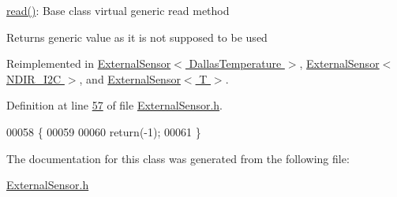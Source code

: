 \hyperlink{class_base_external_sensor_a7e0a98f350148d7645031315657aa5ec}{read()}\+: Base class virtual generic read method

\begin{DoxyReturn}{Returns}
generic value as it is not supposed to be used 
\end{DoxyReturn}


Reimplemented in \hyperlink{class_external_sensor_3_01_dallas_temperature_01_4_a127ead06440ec972c22db2abeb8e2b51}{External\+Sensor$<$ Dallas\+Temperature $>$}, \hyperlink{class_external_sensor_3_01_n_d_i_r___i2_c_01_4_add67f5ecaf47d2ee675e8299aee7322d}{External\+Sensor$<$ N\+D\+I\+R\+\_\+\+I2\+C $>$}, and \hyperlink{class_external_sensor_a6dbf2d6b1c183740ce0f153d6e43ccb2}{External\+Sensor$<$ T $>$}.



Definition at line \hyperlink{_external_sensor_8h_source_l00057}{57} of file \hyperlink{_external_sensor_8h_source}{External\+Sensor.\+h}.


\begin{DoxyCode}
00058     \{
00059 
00060         \textcolor{keywordflow}{return}(-1);
00061     \}
\end{DoxyCode}


The documentation for this class was generated from the following file\+:\begin{DoxyCompactItemize}
\item 
\hyperlink{_external_sensor_8h}{External\+Sensor.\+h}\end{DoxyCompactItemize}
